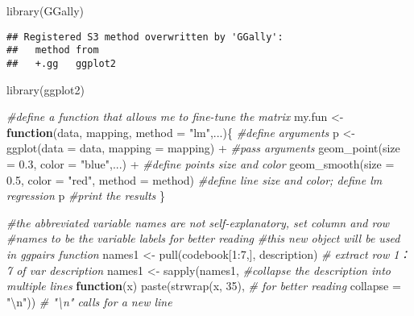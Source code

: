 \documentclass[
]{article}
\newenvironment{Shaded}{\begin{snugshade}}{\end{snugshade}}
\newcommand{\AttributeTok}[1]{\textcolor[rgb]{0.77,0.63,0.00}{#1}}
\newcommand{\CommentTok}[1]{\textcolor[rgb]{0.56,0.35,0.01}{\textit{#1}}}
\newcommand{\ControlFlowTok}[1]{\textcolor[rgb]{0.13,0.29,0.53}{\textbf{#1}}}
\newcommand{\DecValTok}[1]{\textcolor[rgb]{0.00,0.00,0.81}{#1}}
\newcommand{\FloatTok}[1]{\textcolor[rgb]{0.00,0.00,0.81}{#1}}
\newcommand{\FunctionTok}[1]{\textcolor[rgb]{0.00,0.00,0.00}{#1}}
\newcommand{\NormalTok}[1]{#1}
\newcommand{\OtherTok}[1]{\textcolor[rgb]{0.56,0.35,0.01}{#1}}
\newcommand{\SpecialCharTok}[1]{\textcolor[rgb]{0.00,0.00,0.00}{#1}}
\newcommand{\StringTok}[1]{\textcolor[rgb]{0.31,0.60,0.02}{#1}}
\begin{document}
\begin{Shaded}
\begin{Highlighting}[]
\FunctionTok{library}\NormalTok{(GGally)}
\end{Highlighting}
\end{Shaded}

\begin{verbatim}
## Registered S3 method overwritten by 'GGally':
##   method from   
##   +.gg   ggplot2
\end{verbatim}

\begin{Shaded}
\begin{Highlighting}[]
\FunctionTok{library}\NormalTok{(ggplot2)}

\CommentTok{\#define a function that allows me to fine{-}tune the matrix}
\NormalTok{my.fun }\OtherTok{\textless{}{-}} \ControlFlowTok{function}\NormalTok{(data, mapping, }\AttributeTok{method =} \StringTok{"lm"}\NormalTok{,...)\{ }\CommentTok{\#define arguments}
\NormalTok{  p }\OtherTok{\textless{}{-}} \FunctionTok{ggplot}\NormalTok{(}\AttributeTok{data =}\NormalTok{ data, }\AttributeTok{mapping =}\NormalTok{ mapping) }\SpecialCharTok{+} \CommentTok{\#pass arguments}
    \FunctionTok{geom\_point}\NormalTok{(}\AttributeTok{size =} \FloatTok{0.3}\NormalTok{, }
               \AttributeTok{color =} \StringTok{"blue"}\NormalTok{,...) }\SpecialCharTok{+} \CommentTok{\#define points size and color}
    \FunctionTok{geom\_smooth}\NormalTok{(}\AttributeTok{size =} \FloatTok{0.5}\NormalTok{, }
                \AttributeTok{color =} \StringTok{"red"}\NormalTok{, }
                \AttributeTok{method =}\NormalTok{ method) }\CommentTok{\#define line size and color; define lm regression}
\NormalTok{  p }\CommentTok{\#print the results}
\NormalTok{\}}

\CommentTok{\#the abbreviated variable names are not self{-}explanatory, set column and row}
\CommentTok{\#names to be the variable labels for better reading}
\CommentTok{\#this new object will be used in ggpairs function}
\NormalTok{names1 }\OtherTok{\textless{}{-}} \FunctionTok{pull}\NormalTok{(codebook[}\DecValTok{1}\SpecialCharTok{:}\DecValTok{7}\NormalTok{,], description)  }\CommentTok{\# extract row 1：7 of var description}
\NormalTok{names1 }\OtherTok{\textless{}{-}} \FunctionTok{sapply}\NormalTok{(names1,    }\CommentTok{\#collapse the description into multiple lines}
                 \ControlFlowTok{function}\NormalTok{(x) }\FunctionTok{paste}\NormalTok{(}\FunctionTok{strwrap}\NormalTok{(x, }\DecValTok{35}\NormalTok{),  }\CommentTok{\# for better reading}
                                   \AttributeTok{collapse =} \StringTok{"}\SpecialCharTok{\textbackslash{}n}\StringTok{"}\NormalTok{)) }\CommentTok{\# "\textbackslash{}n" calls for a new line}


\end{Highlighting}
\end{Shaded}
\end{document}

